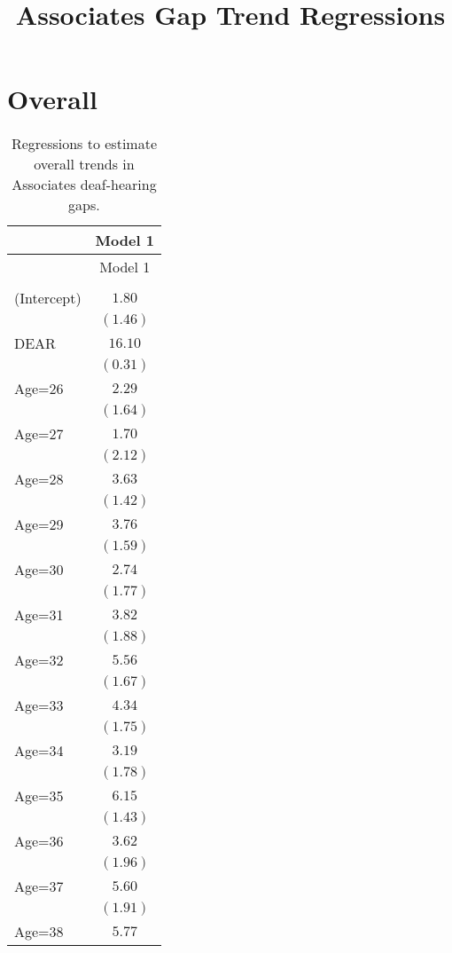 \documentclass[fullpage]{paper}
\title{ Associates Gap Trend Regressions}
\begin{document}
\section{Overall}

\begin{center}
\begin{longtable}{l c }
\hline
 & Model 1 \\
\hline
\endfirsthead
\hline
 & Model 1 \\
\hline
\endhead
\hline
\endfoot
\hline
\multicolumn{2}{l}{\scriptsize{}}\\
\caption{Regressions to estimate overall trends in Associates deaf-hearing gaps.}
\label{table:coefficients}
\endlastfoot
(Intercept) & $1.80$   \\
            & $(1.46)$ \\
DEAR        & $16.10$  \\
            & $(0.31)$ \\
Age=26      & $2.29$   \\
            & $(1.64)$ \\
Age=27      & $1.70$   \\
            & $(2.12)$ \\
Age=28      & $3.63$   \\
            & $(1.42)$ \\
Age=29      & $3.76$   \\
            & $(1.59)$ \\
Age=30      & $2.74$   \\
            & $(1.77)$ \\
Age=31      & $3.82$   \\
            & $(1.88)$ \\
Age=32      & $5.56$   \\
            & $(1.67)$ \\
Age=33      & $4.34$   \\
            & $(1.75)$ \\
Age=34      & $3.19$   \\
            & $(1.78)$ \\
Age=35      & $6.15$   \\
            & $(1.43)$ \\
Age=36      & $3.62$   \\
            & $(1.96)$ \\
Age=37      & $5.60$   \\
            & $(1.91)$ \\
Age=38      & $5.77$   \\

\end{longtable}
\end{center}
\end{document}
